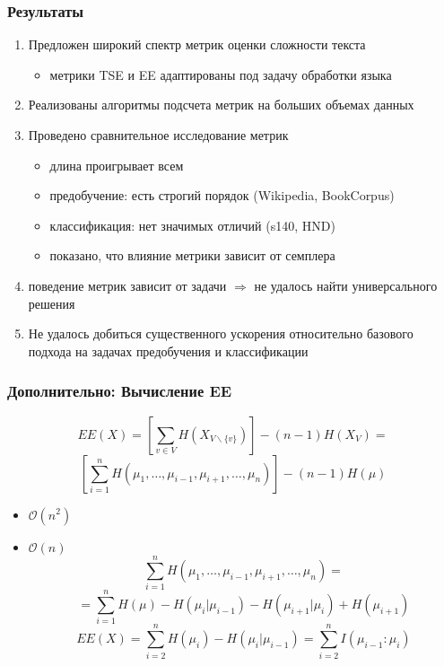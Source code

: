 \documentclass{beamer}
\begin{document}
\begin{frame}
	\frametitle{Результаты}
	\begin{enumerate}
		\item Предложен широкий спектр метрик оценки сложности текста
		\begin{itemize}
			\item метрики TSE и EE адаптированы под задачу обработки языка
		\end{itemize}
		\item Реализованы алгоритмы подсчета метрик на больших объемах данных
		\item Проведено сравнительное исследование метрик
			\begin{itemize}
				\item длина проигрывает всем
				\item предобучение: есть строгий порядок (Wikipedia, BookCorpus)
				\item классификация: нет значимых отличий (s140, HND)
			\end{itemize}
		\begin{itemize}
			\item показано, что влияние метрики зависит от семплера
		\end{itemize}
		\item поведение метрик зависит от задачи $\Rightarrow$ не удалось найти универсального решения
		\item Не удалось добиться существенного ускорения относительно базового подхода на задачах предобучения и классификации
	\end{enumerate}
\end{frame}

\appendix

\begin{frame}[label=supplemental,noframenumbering]
	\frametitle{Дополнительно: Вычисление EE}
	\[
	EE(X) = \left[\sum\limits_{v\in V}H(X_{V\backslash\{v\}})\right] - (n - 1)H(X_V) = 
	\]
	\[
	\left[\sum\limits_{i=1}^{n}H(\mu_1,\ldots,\mu_{i-1},\mu_{i+1},\ldots,\mu_n)\right] - (n - 1)H(\mu)
	\]
	\begin{itemize}
		\item $\mathcal{O}(n^2)$
		\item $\mathcal{O}(n)$
		\[
		\sum\limits_{i=1}^{n}H(\mu_1,\ldots,\mu_{i-1},\mu_{i+1},\ldots,\mu_n) =\]
		\[ = \sum\limits_{i=1}^{n}H(\mu) - H(\mu_i|\mu_{i-1}) - H(\mu_{i+1}|\mu_i) + H(\mu_{i+1})\]
		\[
		EE(X) = \sum\limits_{i=2}^{n}H(\mu_i) - H(\mu_i|\mu_{i-1})= \sum\limits_{i=2}^{n}I(\mu_{i-1}\colon\mu_i)
		\]
	\end{itemize}
\end{frame}
\end{document}
